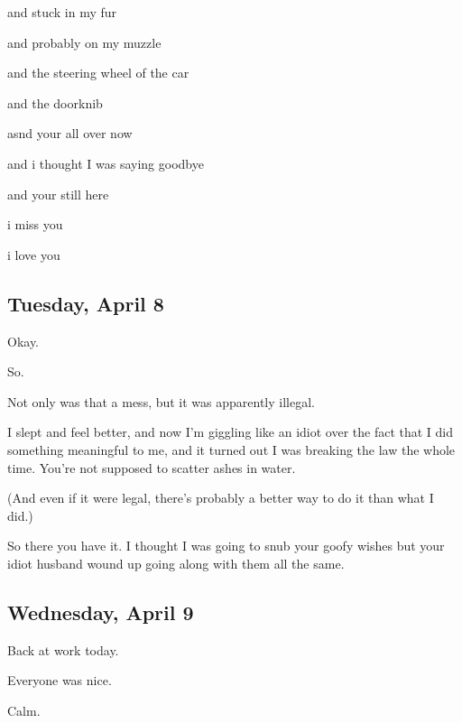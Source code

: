 { and stuck in my fur

 and probably on my muzzle

 and the steering wheel of the car

 and the doorknib

 asnd your all over now

 and i thought I was saying goodbye

 and your still here

 i miss you

 i love you

\newpage

\subsection*{Tuesday, April 8}\label{tuesday-april-8}

 Okay.

 So.

 Not only was that a mess, but it was apparently illegal.

 I slept and feel better, and now I'm giggling like an idiot over the fact that I did something meaningful to me, and it turned out I was breaking the law the whole time. You're not supposed to scatter ashes in water.

(And even if it were legal, there's probably a better way to do it than what I did.)

 So there you have it. I thought I was going to snub your goofy wishes but your idiot husband wound up going along with them all the same.

\newpage

\subsection*{Wednesday, April 9}\label{wednesday-april-9}

 Back at work today.

 Everyone was nice.

 Calm.

}
